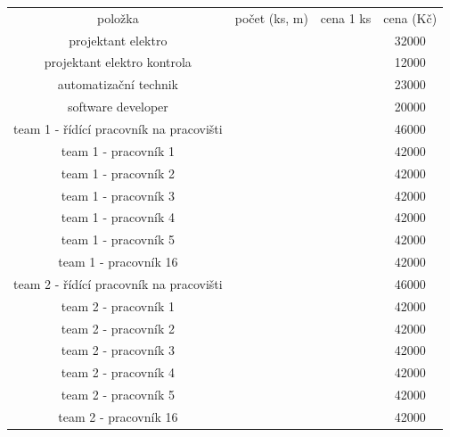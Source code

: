 \documentclass[a4paper, twoside, 11pt]{article}
\begin{document}
			\begin{table}[H]
				\begin{tabular}{ !{\vrule width 2pt} c | c | c | c  !{\vrule width 2pt}}
				položka & počet (ks, m) & cena 1 ks & cena (Kč)\\ 
				projektant elektro && 32000\\ \hline
				projektant elektro kontrola && 12000\\ \hline
				automatizační technik && 23000\\ \hline
				software developer & & 20000\\ \hline
				team 1 - řídící pracovník na pracovišti & & 46000\\ \hline
				team 1 - pracovník 1 & & 42000\\ \hline
				team 1 - pracovník 2 & & 42000\\ \hline
				team 1 - pracovník 3 & & 42000\\ \hline
				team 1 - pracovník 4 & & 42000\\ \hline
				team 1 - pracovník 5 & & 42000\\ \hline
				team 1 - pracovník 16 & & 42000\\ \hline
				
				team 2 - řídící pracovník na pracovišti && 46000\\ \hline
				team 2 - pracovník 1 && 42000\\ \hline
				team 2 - pracovník 2 && 42000\\ \hline
				team 2 - pracovník 3 && 42000\\ \hline
				team 2 - pracovník 4 && 42000\\ \hline
				team 2 - pracovník 5 && 42000\\ \hline
				team 2 - pracovník 16 && 42000\\ \hline
				

\end{tabular}
\end{table}
\end{document}
